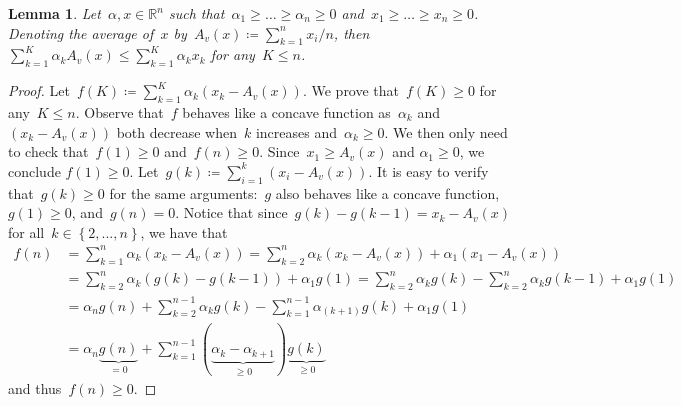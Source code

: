 \documentclass[a4paper,10pt]{article}
\newcommand{\R}{\mathds{R}}
\newcommand{\define}{\coloneqq}
\newcommand{\brackets}[1]{\left\{ #1 \right\}}
\newtheorem{lemma}[theorem]{Lemma}
\theoremstyle{definition}
\begin{document}
\begin{lemma}
  \label{rmk:weighted-average-dom}
  Let~$\alpha, x\in \R^n$ such that~$\alpha_1 \geq \dots \geq \alpha_{n} \geq 0$ and~$x_1 \geq \dots \geq x_{n} \geq 0$.
  Denoting the average of~$x$ by~$A_v(x)\define \sum^n_{k=1} x_i/n$, then $\sum_{k=1}^K \alpha_k A_v(x) \leq \sum_{k=1}^K \alpha_k x_k$ for any~$K\leq n$.
\end{lemma}
\begin{proof}
  Let~$f(K)\coloneq \sum_{k=1}^K \alpha_k (x_k - A_v(x))$. 
  We prove that~$f(K)\geq 0$ for any~$K\leq n$.
  Observe that~$f$ behaves like a concave function as~$\alpha_k$ and~$(x_k - A_v(x))$ both decrease when~$k$ increases and~$\alpha_k \geq 0$.
  We then only need to check that~$f(1) \geq 0$ and~$f(n)\geq 0$.
  Since~$x_1 \geq A_v(x)$ and $\alpha_1 \geq 0$, we conclude $f(1) \geq 0$.
  Let~$g(k)\coloneqq \sum_{i=1}^k (x_i - A_v(x))$.
  It is easy to verify that~$g(k)\geq 0$ for the same arguments:~$g$ also behaves like a  concave function, $g(1)\geq 0$, and~$g(n) = 0$.
  Notice that since~$g(k) - g(k-1) = x_k - A_v(x)$ for all~$k\in \brackets{2, ..., n}$, we have that
  \begin{align*}
    f(n)
    &= \sum_{k = 1}^n \alpha_k(x_k - A_v(x)) = \sum_{k = 2}^n \alpha_k(x_k - A_v(x)) + \alpha_1 (x_1 - A_v(x)) \\
    &= \sum_{k=2}^{n} \alpha_k (g(k) - g(k-1)) + \alpha_1 g(1) = \sum_{k=2}^{n} \alpha_k g(k) - \sum_{k=2}^{n} \alpha_k g(k-1) + \alpha_1 g(1) \\
    &= \alpha_n g(n) + \sum_{k=2}^{n-1} \alpha_k g(k) - \sum_{k=1}^{n-1} \alpha_{(k+1)} g(k) + \alpha_1 g(1) \\
    &= \alpha_n \underbrace{g(n)}_{=0} + \sum_{k = 1}^{n-1} (\underbrace{\alpha_k - \alpha_{k+1}}_{\geq 0}) \underbrace{g(k)}_{\geq 0} 
  \end{align*}
  and thus~$f(n) \geq 0$.
\end{proof}
\end{document}

